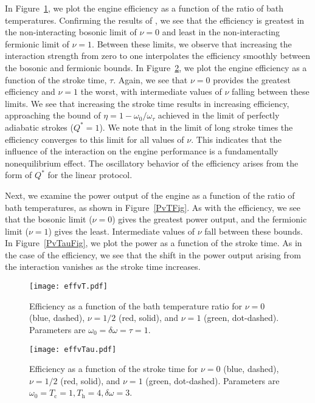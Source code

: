 \documentclass[preprints,article,accept,moreauthors,pdftex]{Definitions/mdpi}
\begin{document}
In Figure~\ref{effvTFig}, we plot the engine efficiency as a function of the ratio of bath temperatures. Confirming the results of \cite{Myers2020}, we see that the efficiency is greatest in the non-interacting bosonic limit of $\nu = 0$ and least in the non-interacting fermionic limit of $\nu = 1$. Between these limits, we observe that increasing the interaction strength from zero to one interpolates the efficiency smoothly between the bosonic and fermionic bounds. In Figure~\ref{effvTauFig}, we plot the engine efficiency as a function of the stroke time, $\tau$. Again, we see that $\nu = 0$ provides the greatest efficiency and $\nu = 1$ the worst, with intermediate values of $\nu$ falling between these limits. We see that increasing the stroke time results in increasing efficiency, approaching the bound of $\eta = 1 - \omega_0/\omega_{\tau}$ achieved in the limit of perfectly adiabatic strokes ($Q^*=1$). We note that in the limit of long stroke times the efficiency converges to this limit for all values of $\nu$. This indicates that the influence of the interaction on the engine performance is a fundamentally nonequilibrium effect. The oscillatory behavior of the efficiency arises from the form of $Q^*$ for the linear protocol.     

Next, we examine the power output of the engine as a function of the ratio of bath temperatures, as shown in Figure~\ref{PvTFig}. As with the efficiency, we see that the bosonic limit ($\nu = 0$) gives the greatest power output, and the fermionic limit ($\nu = 1$) gives the least. Intermediate values of $\nu$ fall between these bounds. In Figure~\ref{PvTauFig}, we plot the power as a function of the stroke time. As in the case of the efficiency, we see that the shift in the power output arising from the interaction vanishes as the stroke time increases.   


\begin{figure}[H]
	\texttt{[image: effvT.pdf]}
	\caption{\label{effvTFig} Efficiency as a function of the bath temperature ratio for $\nu = 0$ (blue, dashed), $\nu = 1/2$ (red, solid), and $\nu = 1$ (green, dot-dashed). Parameters are $\omega_0 = \delta\omega = \tau = 1$.}
\end{figure} 

\vspace{-6pt}

\begin{figure}[H]
	\texttt{[image: effvTau.pdf]}
	\caption{\label{effvTauFig} Efficiency as a function of the stroke time for $\nu = 0$ (blue, dashed), $\nu = 1/2$ (red, solid), and $\nu = 1$ (green, dot-dashed). Parameters are $\omega_0 = T_{\mathrm{c}} = 1, T_{\mathrm{h}} = 4, \delta\omega = 3$.}
\end{figure}    
\end{document}
